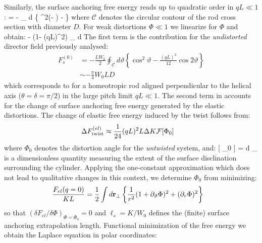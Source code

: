 Similarly, the surface anchoring free energy reads up to quadratic order in $qL \ll 1$:
\beq
   =  - \oint_{} d %
\vartheta \left \{ \cos^{2}(\vartheta - \Phi)  -    \right \}   \eeq
where $\mathcal{C}$ denotes the circular contour of the rod cross section with diameter $D$.
For weak distortions $\Phi \ll 1$ we linearize for $\Phi$ and obtain:
\beq
   \approx {} - (1-  (qL)^{2}) \oint_{} d  \vartheta   {} \vartheta  \Phi
  \label{fsdist}
\eeq
The first term is the contribution for the {\em undistorted} director field previously analysed:
\begin{align}
  F_{s}^{(0)} &=  -\frac{LW_{0}}{2} \oint_{\mathcal{C}} d %
\vartheta \left \{ \cos^{2}\vartheta - \frac{(qL)^{2}}{12} \cos 2  \vartheta \right \} \nonumber \\
& \sim -\frac{\pi}{4} W_{0} LD
\label{sabasis}
\end{align}
which corresponds to  for a homeotropic rod aligned perpendicular to the helical axis ($\theta = \delta = \pi/2$) in the large pitch limit $qL \ll 1$. The second term in  accounts for the change of surface anchoring free energy generated by the elastic distortions.
The change of elastic free energy induced by the twist follows from:
\begin{align}
 \Delta F_{\rm twist}^{(el)}  &\approx  \frac{1}{24} (qL)^{2} L \Delta K   \mathcal{F} [ \Phi_{0} ]
\end{align}
where $\Phi_{0}$ denotes the distortion angle for the {\em untwisted} system, and:
\beq
  [ \Phi_{0} ]  = \int d \bfr_{\perp}  
 \label{fmans}
\eeq
is a dimensionless quantity measuring the extent of the surface disclination surrounding the cylinder. Applying the one-constant approximation which does not lead to qualitative changes in this context, we determine $\Phi_{0}$ from minimizing:
\begin{align}
 \frac{F_{el}(q=0)}{KL} &=  \frac{1}{2} \int d {\bf r}_{\perp}  \left \{ \frac{1}{r^{2}} (1+ \partial_{\vartheta} \Phi)^{2} + (\partial_{r} \Phi)^{2} \right \}
\end{align}
so that $(\delta F_{el} / \delta \Phi )_{\Phi = \Phi_{0}} = 0$ and $\ell_{s}  = K/W_{0}$ defines the (finite) surface anchoring extrapolation length.  Functional minimization of the free energy we obtain the Laplace equation in polar coordinates:

